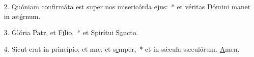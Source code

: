 2. Quóniam confirmáta est super nos misericórda \uline{e}jus:~* et véritas Dómini manet in æt\uline{é}rnum.\par 
3. Glória Patr, et F\uline{í}lio,~* et Spirítui S\uline{a}ncto.\par 
4. Sicut erat in princípio, et nnc, et s\uline{e}mper,~* et in sǽcula sæculórum. \uline{A}men.\par 
